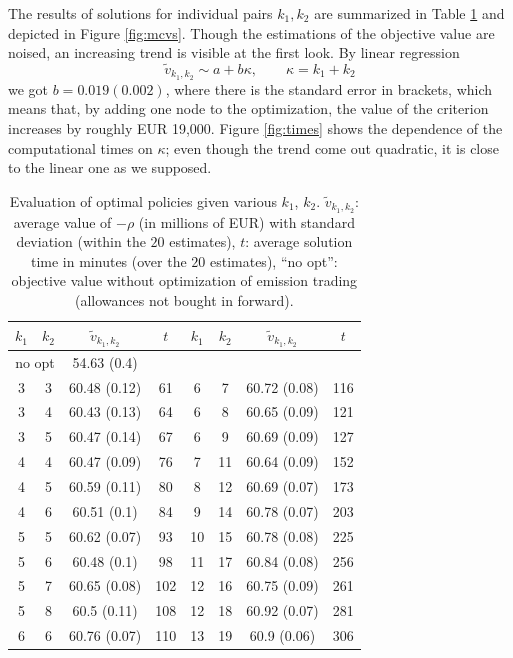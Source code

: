 \documentclass{article}              %
\begin{document}
The results of solutions for individual pairs $k_1,k_2$ are summarized in Table
\ref{tab:res} and depicted in Figure \ref{fig:mcvs}. Though
the estimations of the objective value are noised, an increasing trend is visible
at the first look. By linear regression
\[
\tilde{v}_{k_1,k_2}\sim a+b\kappa,\qquad \kappa=k_{1}+k_{2}
\]
we got $b=0.019(0.002)$, where there is the standard error in brackets, which means that, by adding one node to the
optimization, the value of the criterion increases by roughly EUR 19,000.
Figure \ref{fig:times} shows the dependence of the computational
times on $\kappa$; even though the trend come out quadratic, it is
close to the linear one as we supposed.
\begin{table}
\begin{center}
\begin{tabular}{cccc|cccc}
$k_1$ & $k_2$ & $\tilde v_{k_1,k_2}$ & $t$ & $k_1$ & $k_2$ & $\tilde v_{k_1,k_2}$ & $t$ \\
\hline
	\multicolumn{2}{c}{no opt}		&	54.63	(0.4)	&		\\
\hline
3	&	3	&	60.48	(0.12)	&	61	&	6	&	7	&	60.72	(0.08)	&	116	\\
3	&	4	&	60.43	(0.13)	&	64	&	6	&	8	&	60.65	(0.09)	&	121	\\
3	&	5	&	60.47	(0.14)	&	67	&	6	&	9	&	60.69	(0.09)	&	127	\\
4	&	4	&	60.47	(0.09)	&	76	&	7	&	11	&	60.64	(0.09)	&	152	\\
4	&	5	&	60.59	(0.11)	&	80	&	8	&	12	&	60.69	(0.07)	&	173	\\
4	&	6	&	60.51	(0.1)	&	84	&	9	&	14	&	60.78	(0.07)	&	203	\\
5	&	5	&	60.62	(0.07)	&	93	&	10	&	15	&	60.78	(0.08)	&	225	\\
5	&	6	&	60.48	(0.1)	&	98	&	11	&	17	&	60.84	(0.08)	&	256	\\
5	&	7	&	60.65	(0.08)	&	102	&	12	&	16	&	60.75	(0.09)	&	261	\\
5	&	8	&	60.5	(0.11)	&	108	&	12	&	18	&	60.92	(0.07)	&	281	\\
6	&	6	&	60.76	(0.07)	&	110	&	13	&	19	&	60.9	(0.06)	&	306	\\

\hline
\end{tabular}
\caption{Evaluation of optimal policies given various $k_1$, $k_2$. $\tilde v_{k_{1},k_{2}}$: average value of $-\rho$ (in
millions of EUR) with standard deviation (within the $20$ estimates),
$t$: average solution time in minutes (over the $20$ estimates), ``no opt'': objective value without
optimization of emission trading (allowances not bought in forward).
}
\label{tab:res}
\end{center}
\end{table}
\end{document}
